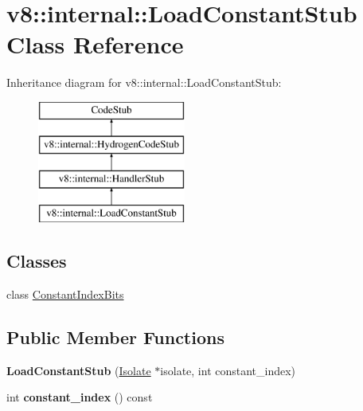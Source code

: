 \hypertarget{classv8_1_1internal_1_1_load_constant_stub}{}\section{v8\+:\+:internal\+:\+:Load\+Constant\+Stub Class Reference}
\label{classv8_1_1internal_1_1_load_constant_stub}
Inheritance diagram for v8\+:\+:internal\+:\+:Load\+Constant\+Stub\+:\begin{figure}[H]
\begin{center}
\leavevmode
\includegraphics[height=4.000000cm]{classv8_1_1internal_1_1_load_constant_stub}
\end{center}
\end{figure}
\subsection*{Classes}
\begin{DoxyCompactItemize}
\item 
class \hyperlink{classv8_1_1internal_1_1_load_constant_stub_1_1_constant_index_bits}{Constant\+Index\+Bits}
\end{DoxyCompactItemize}
\subsection*{Public Member Functions}
\begin{DoxyCompactItemize}
\item 
{\bfseries Load\+Constant\+Stub} (\hyperlink{classv8_1_1internal_1_1_isolate}{Isolate} $\ast$isolate, int constant\+\_\+index)\hypertarget{classv8_1_1internal_1_1_load_constant_stub_a245d7d86c560476919c75d74466ceab2}{}\label{classv8_1_1internal_1_1_load_constant_stub_a245d7d86c560476919c75d74466ceab2}

\item 
int {\bfseries constant\+\_\+index} () const \hypertarget{classv8_1_1internal_1_1_load_constant_stub_a6ba9167615b75131578c8b469c10b273}{}\label{classv8_1_1internal_1_1_load_constant_stub_a6ba9167615b75131578c8b469c10b273}

\end{DoxyCompactItemize}
